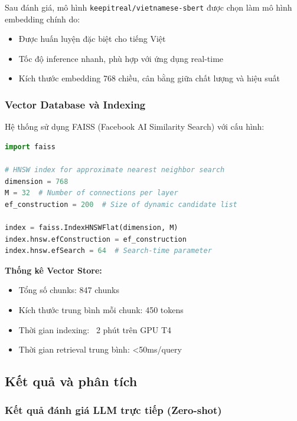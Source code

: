 Sau đánh giá, mô hình \texttt{keepitreal/vietnamese-sbert} được chọn làm mô hình embedding chính do:
\begin{itemize}
    \item Được huấn luyện đặc biệt cho tiếng Việt
    \item Tốc độ inference nhanh, phù hợp với ứng dụng real-time
    \item Kích thước embedding 768 chiều, cân bằng giữa chất lượng và hiệu suất
\end{itemize}

\subsubsection{Vector Database và Indexing}

Hệ thống sử dụng FAISS (Facebook AI Similarity Search) với cấu hình:

\begin{lstlisting}[language=Python, caption={Cấu hình FAISS index}]
import faiss

# HNSW index for approximate nearest neighbor search
dimension = 768
M = 32  # Number of connections per layer
ef_construction = 200  # Size of dynamic candidate list

index = faiss.IndexHNSWFlat(dimension, M)
index.hnsw.efConstruction = ef_construction
index.hnsw.efSearch = 64  # Search-time parameter
\end{lstlisting}

\textbf{Thống kê Vector Store:}
\begin{itemize}
    \item Tổng số chunks: 847 chunks
    \item Kích thước trung bình mỗi chunk: 450 tokens
    \item Thời gian indexing: ~2 phút trên GPU T4
    \item Thời gian retrieval trung bình: <50ms/query
\end{itemize}

\subsection{Kết quả và phân tích}

\subsubsection{Kết quả đánh giá LLM trực tiếp (Zero-shot)}

